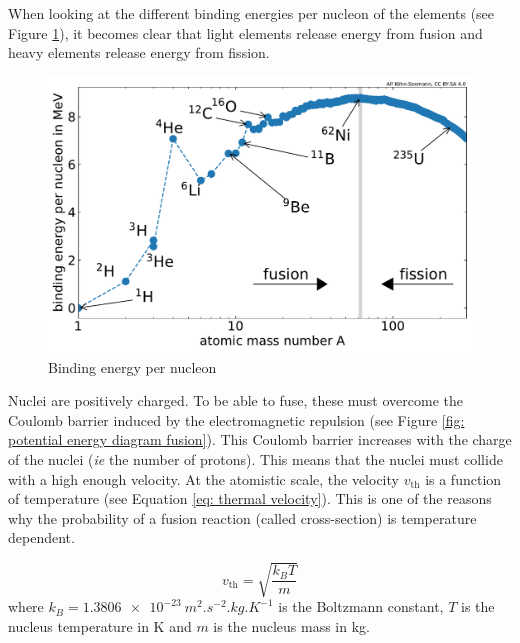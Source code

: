 When looking at the different binding energies per nucleon of the elements (see Figure \ref{fig: binding energy per nucleon}), it becomes clear that light elements release energy from fusion and heavy elements release energy from fission.

\begin{figure} [h]
    \centering
    \includegraphics[width=\linewidth]{Figures/Chapter1/binding_energy_per_nucleon.pdf}
    \caption{Binding energy per nucleon \cite{kohn-seemann_alfkoehnfusion_plots_2021}}
    \label{fig: binding energy per nucleon}
\end{figure}

Nuclei are positively charged.
To be able to fuse, these must overcome the Coulomb barrier induced by the electromagnetic repulsion (see Figure \ref{fig: potential energy diagram fusion}).
This Coulomb barrier increases with the charge of the nuclei (\textit{ie} the number of protons).
This means that the nuclei must collide with a high enough velocity.
At the atomistic scale, the velocity $v_\mathrm{th}$ is a function of temperature (see Equation \ref{eq: thermal velocity}).
This is one of the reasons why the probability of a fusion reaction (called cross-section) is temperature dependent.

\begin{equation}
    v_\mathrm{th} = \sqrt{\frac{k_B T}{m}}
    \label{eq: thermal velocity}
\end{equation}
where $k_B = \SI{1.3806e-23}{m^2.s^{-2}.kg.K^{-1}}$ is the Boltzmann constant, $T$ is the nucleus temperature in \si{K} and $m$ is the nucleus mass in \si{kg}.



